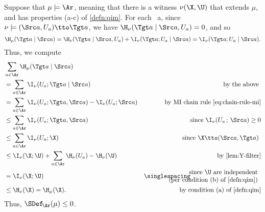 \begin{subappendices}
\begin{lproof}
        \label{proof:sdef-le0}
    Suppose that $\mu \models \Ar$, meaning that there is a witness $\nu(\X, \U)$ that extends $\mu$, and has properties (a-c) of \cref{defn:qim}. 
    For each \arc\ a, since
    $\nu \models (\Src a, U_a) \tto \Tgt a$, 
    we have
    $\H_\nu(\Tgt a \mid \Src a, U_a) = 0$, and so
    \[
    \H_\mu(\Tgt a \mid \Src a) = \H_\nu(\Tgt a \mid \Src a, U_a) + \I_\nu(\Tgt a ; U_a \mid \Src a) = \I_\nu(\Tgt a; U_a \mid \Src a).
    \]
    Thus, we compute    
    \begin{align*}
        &\sum_{a \in \Ar} \H_\mu(\Tgt a \mid \Src a)\\
        &= \sum_{a \in \Ar} \I_\nu(U_a ; \Tgt a \mid \Src a) 
            & \text { by the above } \\
        &= \sum_{a \in \Ar} \I_\nu(U_a ; \Tgt a, \Src a) - \I_\nu(U_a ; \Src a)
            & \text{ by MI chain rule \eqref{eq:chain-rule-mi}} \\
        &\le \sum_{a \in \Ar} \I_\nu(U_a ; \Tgt a, \Src a) 
            & \text{ since $\I_\nu(U_a\,;\,\Src a) \ge 0$} 
        \\
        &\le \sum_{a \in \Ar} \I_\nu(U_a ; \X) 
            &\text{ since $\X \tto (\Src a, \Tgt a)$ }
        \\
        &\le \I_\nu(\X ; \U) + \sum_{a \in \Ar} \H_\nu( U_a ) - \H_\nu(\U)
            & \text{ by \cref{lem:Y-filter}}
        \\
        &= \I_\nu(\X ; \U) 
            &
            {\singlespacing\hspace{-1.5cm}
            \begin{array}{r}\text{ since $\U$ are independent}\\
                \text{ (per condition (b) of \cref{defn:qim})} \end{array}
            }
        \\
        &\le \H_\nu(\X) = \H_\mu(\X).
            &
            \hspace{-1.5cm}
            \text{by condition (a) of \cref{defn:qim}}
    \end{align*}
    Thus, $\SDef_{\!\Ar}(\mu) \le 0$. \qedhere
\end{lproof}



\end{subappendices}

